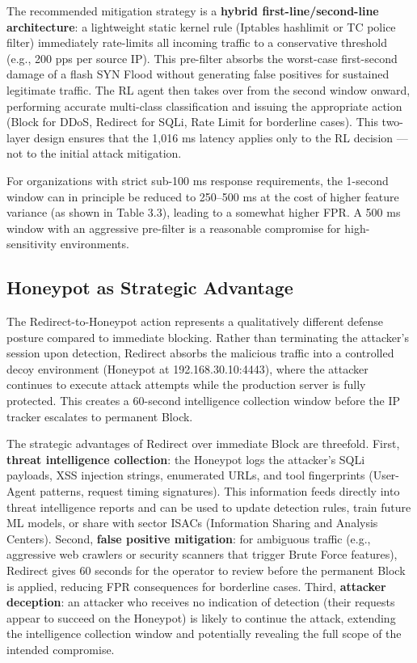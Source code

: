 \documentclass[12pt,a4paper]{report}
\begin{document}
The recommended mitigation strategy is a \textbf{hybrid first-line/second-line architecture}: a lightweight static kernel rule (Iptables hashlimit or TC police filter) immediately rate-limits all incoming traffic to a conservative threshold (e.g., 200 pps per source IP). This pre-filter absorbs the worst-case first-second damage of a flash SYN Flood without generating false positives for sustained legitimate traffic. The RL agent then takes over from the second window onward, performing accurate multi-class classification and issuing the appropriate action (Block for DDoS, Redirect for SQLi, Rate Limit for borderline cases). This two-layer design ensures that the 1,016 ms latency applies only to the RL decision --- not to the initial attack mitigation.

For organizations with strict sub-100 ms response requirements, the 1-second window can in principle be reduced to 250--500 ms at the cost of higher feature variance (as shown in Table 3.3), leading to a somewhat higher FPR. A 500 ms window with an aggressive pre-filter is a reasonable compromise for high-sensitivity environments.

\subsection{Honeypot as Strategic Advantage}

The Redirect-to-Honeypot action represents a qualitatively different defense posture compared to immediate blocking. Rather than terminating the attacker's session upon detection, Redirect absorbs the malicious traffic into a controlled decoy environment (Honeypot at 192.168.30.10:4443), where the attacker continues to execute attack attempts while the production server is fully protected. This creates a 60-second intelligence collection window before the IP tracker escalates to permanent Block.

The strategic advantages of Redirect over immediate Block are threefold. First, \textbf{threat intelligence collection}: the Honeypot logs the attacker's SQLi payloads, XSS injection strings, enumerated URLs, and tool fingerprints (User-Agent patterns, request timing signatures). This information feeds directly into threat intelligence reports and can be used to update detection rules, train future ML models, or share with sector ISACs (Information Sharing and Analysis Centers). Second, \textbf{false positive mitigation}: for ambiguous traffic (e.g., aggressive web crawlers or security scanners that trigger Brute Force features), Redirect gives 60 seconds for the operator to review before the permanent Block is applied, reducing FPR consequences for borderline cases. Third, \textbf{attacker deception}: an attacker who receives no indication of detection (their requests appear to succeed on the Honeypot) is likely to continue the attack, extending the intelligence collection window and potentially revealing the full scope of the intended compromise.
\end{document}
